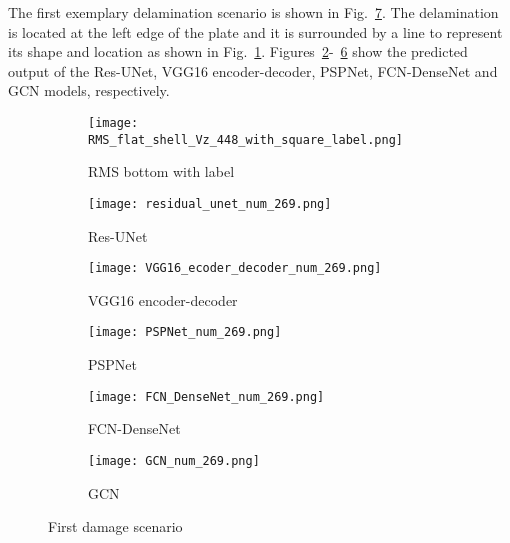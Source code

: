 The first exemplary delamination scenario is shown in Fig.~\ref{fig:softmax_448}. 
The delamination is located at the left edge of the plate and it is surrounded by a line to represent its shape and location as shown in Fig.~\ref{fig:RMS_flat_shell_Vz_448}.
Figures~\ref{fig:unet_pred_448}-~\ref{fig:gcn_pred_448} show the predicted output of the Res-UNet, VGG16 encoder-decoder, PSPNet, FCN-DenseNet and GCN models, respectively. 
\begin{figure}[!h]
	\centering
	\begin{subfigure}[b]{0.47\textwidth}
		\centering
		\texttt{[image: RMS\_flat\_shell\_Vz\_448\_with\_square\_label.png]}
		\caption{RMS bottom with label}
		\label{fig:RMS_flat_shell_Vz_448}
	\end{subfigure}
	\hfill
	\begin{subfigure}[b]{0.47\textwidth}
		\centering
		\texttt{[image: residual\_unet\_num\_269.png]}
		\caption{Res-UNet}
		\label{fig:unet_pred_448}
	\end{subfigure}
	\hfill
	\begin{subfigure}[b]{0.47\textwidth}
		\centering
		\texttt{[image: VGG16\_ecoder\_decoder\_num\_269.png]}
		\caption{VGG16 encoder-decoder}
		\label{fig:vgg16_pred_448}
	\end{subfigure}
	\hfill
	\begin{subfigure}[b]{0.47\textwidth}
		\centering
		\texttt{[image: PSPNet\_num\_269.png]}
		\caption{PSPNet}
		\label{fig:pspnet_pred_448}
	\end{subfigure}
	\hfill
	\begin{subfigure}[b]{0.47\textwidth}
		\centering
		\texttt{[image: FCN\_DenseNet\_num\_269.png]}
		\caption{FCN-DenseNet}
		\label{fig:fcn_densenet_pred_448}
	\end{subfigure}
	\hfill
	\begin{subfigure}[b]{0.47\textwidth}
		\centering
		\texttt{[image: GCN\_num\_269.png]}
		\caption{GCN}
		\label{fig:gcn_pred_448}
	\end{subfigure}
	\caption{First damage scenario}
	\label{fig:softmax_448}
\end{figure} 
\clearpage
